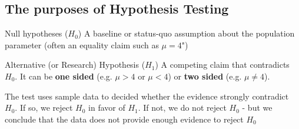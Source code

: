 \documentclass[10pt, total={6in, 8in}]{extarticle}
\begin{document}
\subsection{The purposes of Hypothesis Testing}
\begin{definitionbox}{Null hypotheses ($H_0$)}{}
    A baseline or status-quo assumption about the population parameter (often an equality claim such as $\mu = 4$")
\end{definitionbox}
\begin{definitionbox}{Alternative (or Research) Hypothesis ($H_1$)}{}
    A competing claim that contradicts $H_0$. It can be \textbf{one sided} (e.g. $\mu > 4$ or $\mu < 4$) or \textbf{two sided} (e.g. $\mu \neq 4$).
\end{definitionbox}
\noindent The test uses sample data to decided whether the evidence strongly contradict $H_0$. If so, we reject $H_0$ in favor of $H_1$. If not, we do not reject $H_0$ - but we conclude that  the data does not provide enough evidence to reject $H_0$
\end{document}
